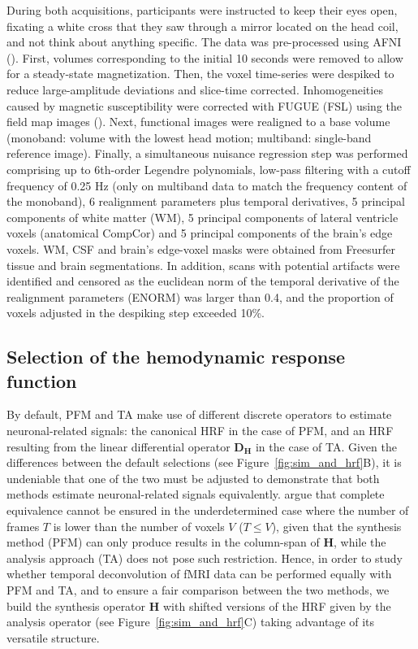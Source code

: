 During both acquisitions, participants were instructed to keep their eyes open, fixating a white cross that they saw through a mirror located on the head coil, and not think about anything specific. The data was pre-processed using AFNI (\citealt{Cox1996AFNISoftwareAnalysis}). First, volumes corresponding to the initial 10 seconds were removed to allow for a steady-state magnetization. Then, the voxel time-series were despiked to reduce large-amplitude deviations and slice-time corrected. Inhomogeneities caused by magnetic susceptibility were corrected with FUGUE (FSL) using the field map images (\citealt{Jenkinson2012FSL}). Next, functional images were realigned to a base volume (monoband: volume with the lowest head motion; multiband: single-band reference image). Finally, a simultaneous nuisance regression step was performed comprising up to 6th-order Legendre polynomials, low-pass filtering with a cutoff frequency of 0.25 Hz (only on multiband data to match the frequency content of the monoband), 6 realignment parameters plus temporal derivatives, 5 principal components of white matter (WM), 5 principal components of lateral ventricle voxels (anatomical CompCor) and 5 principal components of the brain's edge voxels. WM, CSF and brain's edge-voxel masks were obtained from Freesurfer tissue and brain segmentations. In addition, scans with potential artifacts were identified and censored as the euclidean norm of the temporal derivative of the realignment parameters (ENORM) was larger than 0.4, and the proportion of voxels adjusted in the despiking step exceeded 10\%.

\subsection{Selection of the hemodynamic response function}

By default, PFM and TA make use of different discrete operators to estimate neuronal-related signals: the canonical HRF in the case of PFM, and an HRF resulting from the linear differential operator $\mathbf{D_H}$ in the case of TA. Given the differences between the default selections (see Figure~\ref{fig:sim_and_hrf}B), it is undeniable that one of the two must be adjusted to demonstrate that both methods estimate neuronal-related signals equivalently. \citealt{Elad2007Analysisversussynthesis} argue that complete equivalence cannot be ensured in the underdetermined case where the number of frames $T$ is lower than the number of voxels $V$ ($T \leq V$), given that the synthesis method (PFM) can only produce results in the column-span of $\mathbf{H}$, while the analysis approach (TA) does not pose such restriction. Hence, in order to study whether temporal deconvolution of fMRI data can be performed equally with PFM and TA, and to ensure a fair comparison between the two methods, we build the synthesis operator $\mathbf{H}$ with shifted versions of the HRF given by the analysis operator (see Figure~\ref{fig:sim_and_hrf}C) taking advantage of its versatile structure.

